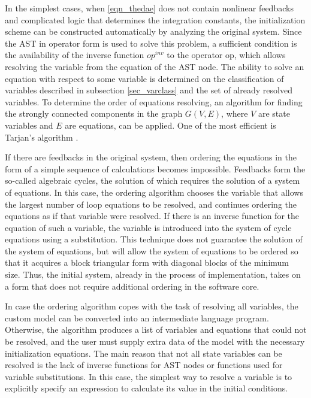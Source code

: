 \documentclass[lettersize,journal]{IEEEtran}
\begin{document}
In the simplest cases, when \eqref{eqn_thedae} does not contain nonlinear feedbacks and complicated logic that determines the
integration constants, the initialization scheme can be constructed automatically by analyzing the original system. 
Since the AST in operator form is used to solve this problem, a sufficient condition is the availability of the inverse 
function \(op^{inv}\) to the operator op, which allows resolving the variable from the equation of the AST node. 
The ability to solve an equation with respect to some variable is determined on the classification of variables described in
subsection \ref{sec_varclass} and the set of already resolved variables. To determine the order of equations resolving, 
an algorithm for finding the strongly connected components in the graph \(G(V,E)\), where \(V\) are state variables and \(E\) 
are equations, can be applied. One of the most efficient is Tarjan's algorithm \cite{sedgwwick11}.

If there are feedbacks in the original system, then ordering the equations in the form of a simple sequence of calculations
becomes impossible. Feedbacks form the so-called algebraic cycles, the solution of which requires the solution of a system of
equations. In this case, the ordering algorithm chooses the variable that allows the largest number of loop equations to be
resolved, and continues ordering the equations as if that variable were resolved. If there is an inverse function for the
equation of such a variable, the variable is introduced into the system of cycle equations using a substitution. 
This technique does not guarantee the solution of the system of equations, but will allow the system of equations to be 
ordered so that it acquires a block triangular form with diagonal blocks of the minimum size. Thus, the initial system, 
already in the process of implementation, takes on a form that does not require additional ordering in the software core.

In case the ordering algorithm copes with the task of resolving all variables, the custom model can be converted into an
intermediate language program. Otherwise, the algorithm produces a list of variables and equations that could not be resolved,
and the user must supply extra data of the model with the necessary initialization equations. The main reason that not all 
state variables can be resolved is the lack of inverse functions for AST nodes or functions used for variable substitutions. 
In this case, the simplest way to resolve a variable is to explicitly specify an expression to calculate its value in the 
initial conditions.
\end{document}
